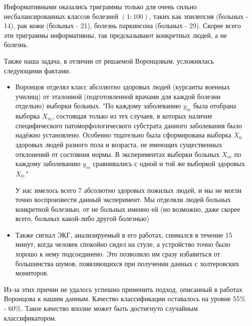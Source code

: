 Информативными оказались триграммы только для очень сильно несбалансированных классов болезней $(1:100)$, таких как эпилепсия (больных - 14), рак кожи (больных - 21), болезнь паркинсона (больных - 29). Скорее всего эти триграммы информативны, так предсказывают конкретных людей, а не болезнь.

Также наша задача, в отличии от решаемой Воронцовым, усложнялась следующими фактами.
\begin{itemize}
	\item Воронцов отделял класс абсолютно здоровых людей (курсанты военных училищ) от эталонной (подготовленной врачами для каждой болезни отдельно) выборки больных. "По каждому заболеванию $y_m$ была отобрана выборка $X_m$, состоящая только из тех случаев, в которых наличие специфического патоморфологического субстрата данного заболевания было надёжно установлено. Особенно тщательно была сформирована выборка $X_0$ здоровых людей разного пола и возраста, не имеющих существенных отклонений от состояния нормы. В экспериментах выборки больных $X_m$ по каждому заболеванию $y_m$ сравнивались с одной и той же выборкой здоровых $X_0$."
	
	У нас имелось всего 7 абсолютно здоровых пожилых людей, и мы не могли точно воспроизвести данный эксперимент. Мы отделяли людей больных конкретной болезнью, от не больных именно ей (но возможно, даже скорее всего, больных какой-либо другой болезнью)
	\item Также сигнал ЭКГ, анализируемый в его работах, снимался в течение 15 минут, когда человек спокойно сидел на стуле, а устройство точно было хорошо к нему подсоединено. Это позволило им сразу избавиться от большинства шумов, появляющихся при получении данных с холтеровских мониторов. 
\end{itemize}

Из-за этих причин не удалось успешно применить подход, описанный в работах Воронцова к нашим данным. Качество классификации оставалось на уровне 55\% - 60\%. Такое качество вполне может быть достигнуто случайным классификатором.


